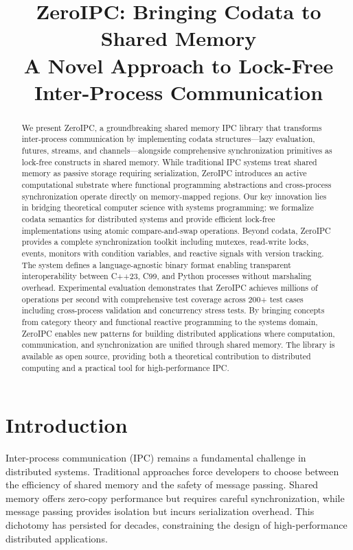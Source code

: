 \documentclass[10pt,conference]{IEEEtran}
\title{ZeroIPC: Bringing Codata to Shared Memory\\
\large A Novel Approach to Lock-Free Inter-Process Communication}
\author{
\IEEEauthorblockN{Anonymous Authors}
\IEEEauthorblockA{Submission for Review}
}
\begin{document}
\maketitle

\begin{abstract}
We present ZeroIPC, a groundbreaking shared memory IPC library that transforms inter-process communication by implementing codata structures---lazy evaluation, futures, streams, and channels---alongside comprehensive synchronization primitives as lock-free constructs in shared memory. While traditional IPC systems treat shared memory as passive storage requiring serialization, ZeroIPC introduces an active computational substrate where functional programming abstractions and cross-process synchronization operate directly on memory-mapped regions. Our key innovation lies in bridging theoretical computer science with systems programming: we formalize codata semantics for distributed systems and provide efficient lock-free implementations using atomic compare-and-swap operations. Beyond codata, ZeroIPC provides a complete synchronization toolkit including mutexes, read-write locks, events, monitors with condition variables, and reactive signals with version tracking. The system defines a language-agnostic binary format enabling transparent interoperability between C++23, C99, and Python processes without marshaling overhead. Experimental evaluation demonstrates that ZeroIPC achieves millions of operations per second with comprehensive test coverage across 200+ test cases including cross-process validation and concurrency stress tests. By bringing concepts from category theory and functional reactive programming to the systems domain, ZeroIPC enables new patterns for building distributed applications where computation, communication, and synchronization are unified through shared memory. The library is available as open source, providing both a theoretical contribution to distributed computing and a practical tool for high-performance IPC.
\end{abstract}

\section{Introduction}

Inter-process communication (IPC) remains a fundamental challenge in distributed systems. Traditional approaches force developers to choose between the efficiency of shared memory and the safety of message passing. Shared memory offers zero-copy performance but requires careful synchronization, while message passing provides isolation but incurs serialization overhead. This dichotomy has persisted for decades, constraining the design of high-performance distributed applications.
\end{document}
